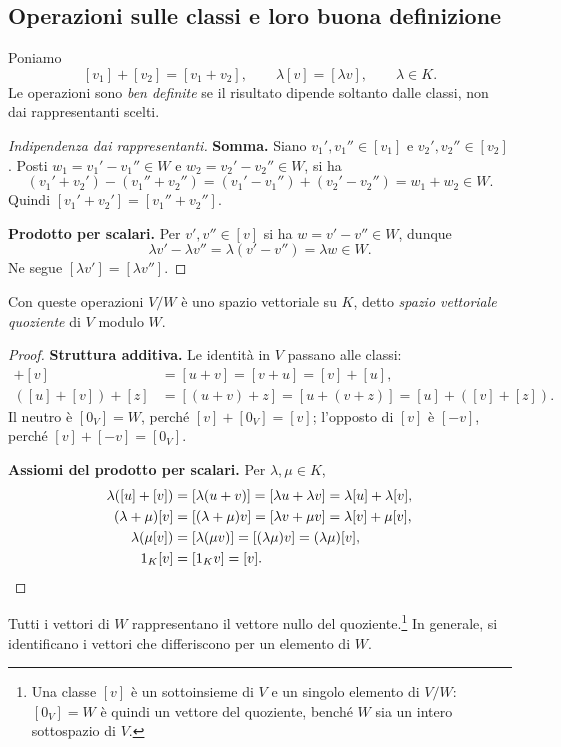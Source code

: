 \subsection{Operazioni sulle classi e loro buona definizione}

Poniamo
\[
  [v_1]+[v_2]=[v_1+v_2],\qquad \lambda[v]=[\lambda v],\qquad\lambda\in K.
\]
Le operazioni sono \emph{ben definite} se il risultato dipende soltanto dalle classi, non dai rappresentanti scelti.

\begin{proof}[Indipendenza dai rappresentanti]
\textbf{Somma.} Siano $v_1',v_1''\in[v_1]$ e $v_2',v_2''\in[v_2]$. Posti $w_1=v_1'-v_1''\in W$ e $w_2=v_2'-v_2''\in W$, si ha
\[
  (v_1'+v_2')-(v_1''+v_2'')
  =(v_1'-v_1'')+(v_2'-v_2'')=w_1+w_2\in W.
\]
Quindi $[v_1'+v_2']=[v_1''+v_2'']$.

\textbf{Prodotto per scalari.} Per $v',v''\in[v]$ si ha $w=v'-v''\in W$, dunque
\[
  \lambda v'-\lambda v''=\lambda(v'-v'')=\lambda w\in W.
\]
Ne segue $[\lambda v']=[\lambda v'']$.
\end{proof}

\begin{proposizione}
Con queste operazioni $V/W$ è uno spazio vettoriale su $K$, detto \emph{spazio vettoriale quoziente} di $V$ modulo $W$.
\end{proposizione}
\begin{proof}
\textbf{Struttura additiva.} Le identità in $V$ passano alle classi:
\begin{align*}
  [u]+[v]&=[u+v]=[v+u]=[v]+[u],\\
  ([u]+[v])+[z]&=[(u+v)+z]=[u+(v+z)]=[u]+([v]+[z]).
\end{align*}
Il neutro è $[0_V]=W$, perché $[v]+[0_V]=[v]$; l'opposto di $[v]$ è $[-v]$, perché $[v]+[-v]=[0_V]$.

\textbf{Assiomi del prodotto per scalari.} Per $\lambda,\mu\in K$,
\begin{align*}
  \lambda([u]+[v])&=[\lambda(u+v)]=[\lambda u+\lambda v]=\lambda[u]+\lambda[v],\\
  (\lambda+\mu)[v]&=[(\lambda+\mu)v]=[\lambda v+\mu v]=\lambda[v]+\mu[v],\\
  \lambda(\mu[v])&=[\lambda(\mu v)]=[(\lambda\mu)v]=(\lambda\mu)[v],\\
  1_K[v]&=[1_Kv]=[v].\qedhere
\end{align*}
\end{proof}

Tutti i vettori di $W$ rappresentano il vettore nullo del quoziente.\footnote{Una classe $[v]$ è un sottoinsieme di $V$ e un singolo elemento di $V/W$: $[0_V]=W$ è quindi un vettore del quoziente, benché $W$ sia un intero sottospazio di $V$.} In generale, si identificano i vettori che differiscono per un elemento di $W$.

